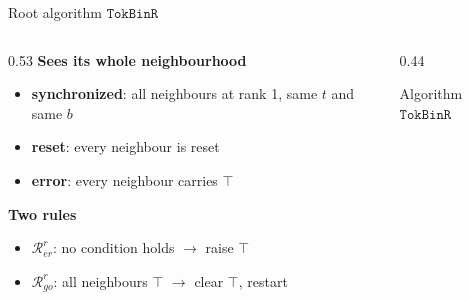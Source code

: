 \documentclass[aspectratio=169,11pt]{beamer}
\newcommand{\Rer}{\ensuremath{\mathscr{R}^{r}_{er}}}
\newcommand{\Rgo}{\ensuremath{\mathscr{R}^{r}_{go}}}
\newcommand{\bodyfont}{\footnotesize}
\newcommand{\captionfont}{\fontsize{7.5}{9.0}\selectfont}
\begin{document}
\begin{frame}{Root algorithm \texorpdfstring{$\mathtt{TokBinR}$}{TokBinR}}
\begin{columns}[T]
\begin{column}{0.53\textwidth}
\bodyfont
\textbf{Sees its whole neighbourhood}
\begin{itemize}\setlength\itemsep{3pt}
\item \textbf{synchronized}: all neighbours at rank 1,
      same $t$ and same $b$
\item \textbf{reset}: every neighbour is reset
\item \textbf{error}: every neighbour carries $\top$
\end{itemize}
\vspace{2.5mm}
\textbf{Two rules}
\begin{itemize}\setlength\itemsep{4pt}
\item \Rer: no condition holds $\rightarrow$ raise $\top$
\item \Rgo: all neighbours $\top$ $\rightarrow$ clear $\top$, restart
\end{itemize}
\end{column}
\begin{column}{0.44\textwidth}
\centering
\vspace*{6mm}
\par\vspace{2mm}
{\captionfont Algorithm $\mathtt{TokBinR}$}
\end{column}
\end{columns}
\end{frame}
\end{document}
